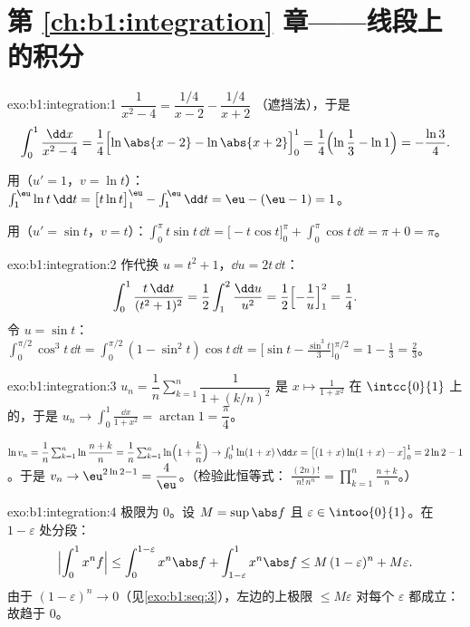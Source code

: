 \section*{第 \ref{ch:b1:integration} 章——线段上的积分}

\begin{solution}{exo:b1:integration:1}
$\dfrac{1}{x^2-4} = \dfrac{1/4}{x - 2} - \dfrac{1/4}{x+2}$
（遮挡法），于是
\[
\int_0^1 \frac{\dd x}{x^2 - 4}
= \frac14\Bigl[\ln\abs{x-2} - \ln\abs{x+2}\Bigr]_0^1
= \frac14\Bigl(\ln\frac{1}{3} - \ln 1\Bigr) = -\frac{\ln 3}{4}.
\]

用（$u' = 1$，$v = \ln t$）：$\int_1^{\eu} \ln t\,\dd t =
\bigl[t\ln t\bigr]_1^{\eu} - \int_1^{\eu} \dd t = \eu - (\eu - 1) =
1$。

用（$u' = \sin t$，$v = t$）：$\int_0^\pi t\sin t\,\dd t =
\bigl[-t\cos t\bigr]_0^\pi + \int_0^\pi \cos t\,\dd t = \pi + 0 =
\pi$。
\end{solution}

\begin{solution}{exo:b1:integration:2}
作代换 $u = t^2 + 1$，$\dd u = 2t\,\dd t$：
\[
\int_0^1 \frac{t\,\dd t}{(t^2+1)^2}
= \frac12 \int_1^2 \frac{\dd u}{u^2}
= \frac12\Bigl[-\frac1u\Bigr]_1^2 = \frac14 .
\]
令 $u = \sin t$：$\int_0^{\pi/2} \cos^3 t\,\dd t = \int_0^{\pi/2}
(1 - \sin^2 t)\cos t\,\dd t = \bigl[\sin t - \frac{\sin^3
t}{3}\bigr]_0^{\pi/2} = 1 - \frac13 = \frac23$。
\end{solution}

\begin{solution}{exo:b1:integration:3}
$u_n = \dfrac1n \sum_{k=1}^{n} \dfrac{1}{1 + (k/n)^2}$ 是
$x \mapsto \frac{1}{1+x^2}$ 在 $\intcc{0}{1}$ 上的，于是 $u_n \to
\int_0^1 \frac{\dd x}{1+x^2} = \arctan 1 = \dfrac\pi4$。

$\ln v_n = \dfrac1n \sum_{k=1}^{n} \ln\dfrac{n+k}{n} = \dfrac 1n
\sum_{k=1}^n \ln\Bigl(1 + \dfrac kn\Bigr) \to \int_0^1 \ln(1+x)\,\dd
x = \bigl[(1+x)\ln(1+x) - x\bigr]_0^1 = 2\ln 2 - 1$。于是 $v_n \to
\eu^{2\ln 2 - 1} = \dfrac 4\eu$。（检验此恒等式：
$\frac{(2n)!}{n!\,n^n} = \prod_{k=1}^{n} \frac{n+k}{n}$。）
\end{solution}

\begin{solution}{exo:b1:integration:4}
极限为 $0$。设 $M = \sup \abs f$ 且 $\varepsilon \in
\intoo{0}{1}$。在 $1 - \varepsilon$ 处分段：
\[
\Bigl| \int_0^1 x^n f \Bigr|
\leq \int_0^{1 - \varepsilon} x^n \abs f + \int_{1-\varepsilon}^1
x^n \abs f
\leq M\,(1-\varepsilon)^n + M\varepsilon .
\]
由于 $(1 - \varepsilon)^n \to 0$（见\cref{exo:b1:seq:3}），左边的上极限
$\leq M\varepsilon$ 对每个 $\varepsilon$ 都成立：
故趋于 $0$。
\end{solution}

